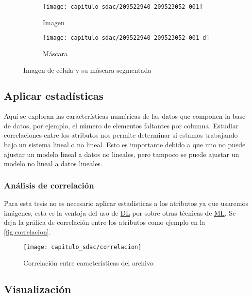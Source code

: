 \begin{figure}[H]
    \centering
    \begin{subfigure}{.5\textwidth}
        \centering
        \texttt{[image: capitulo\_sdac/209522940-209523052-001]}
        \caption{Imagen}
    \end{subfigure}%
    \begin{subfigure}{.5\textwidth}
        \centering
        \texttt{[image: capitulo\_sdac/209522940-209523052-001-d]}
        \caption{Máscara}
    \end{subfigure}
    \caption{Imagen de célula y su máscara segmentada}\label{fig:imagen_mascara}
    \end{figure}

\subsection{Aplicar estadísticas}

Aquí se exploran las características numéricas de las datos que componen la base
de datos, por ejemplo, el número de elementos faltantes por columna. Estudiar
correlaciones entre los atributos nos permite determinar si estamos trabajando
bajo un sistema lineal o no lineal. Esto es importante debido a que uno no puede
ajustar un modelo lineal a datos no lineales, pero tampoco se puede ajustar un
modelo no lineal a datos lineales. 

\subsubsection{Análisis de correlación}

Para esta tesis no es necesario aplicar estadísticas a los atributos ya que
usaremos imágenes, esta es la ventaja del uso de \hyperlink{abbr}{DL} por sobre
otras técnicas de \hyperlink{abbr}{ML}. Se deja la gráfica de correlación entre
los atributos como ejemplo en la \autoref{fig:correlacion}.

\begin{figure}[H]
\centering
\texttt{[image: capitulo\_sdac/correlacion]}
\caption{Correlación entre características del archivo}\label{fig:correlacion}
\end{figure}

\subsection{Visualización}

